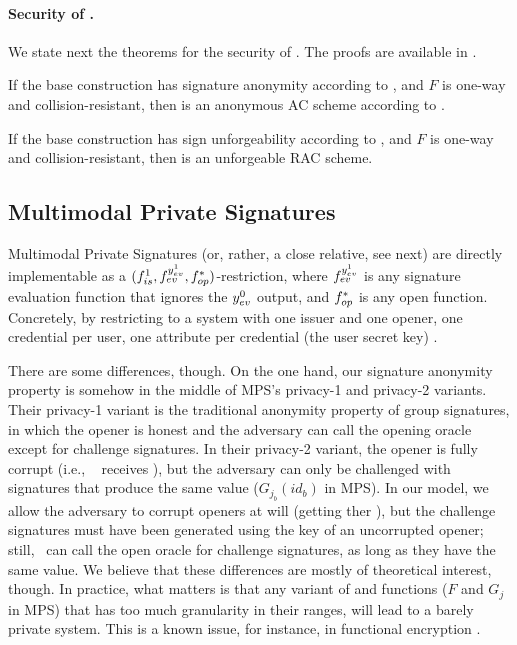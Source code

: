 \paragraph{Security of \CUASRAC.} %
We state next the theorems for the security of \CUASRAC. The proofs are
available in .

\begin{theorem}
  If the base \CUASGen construction has signature anonymity according to
  , and $F$ is one-way and collision-resistant,
  then \CUASAC is an anonymous AC scheme according to \cite{fhs19}.  
\end{theorem}

\begin{theorem}
  If the base \CUASGen construction has sign unforgeability according to
  , and $F$ is one-way and collision-resistant, then
  \CUASRAC is an unforgeable RAC scheme.
\end{theorem}


\subsection{Multimodal Private Signatures}
\label{ssec:related-models-mps}

Multimodal Private Signatures (or, rather, a close relative, see next) are
directly implementable as a $(f_{is}^1,f_{ev}^{y_{ev}^1},
f_{op}^{\ast})$-\CUASGen restriction, where $f_{ev}^{y_{ev}^1}$ is any signature
evaluation function that ignores the $y_{ev}^0$ output, and $f_{op}^{\ast}$ is
any open function. Concretely, by restricting to a system with one issuer and
one opener, one credential per user, one attribute per credential (the user
secret key)%
.

There are some differences, though. On the one hand, our signature anonymity
property is somehow in the middle of MPS's privacy-1 and privacy-2 variants.
Their privacy-1 variant is the traditional anonymity property of group
signatures, in which the opener is honest and the adversary can call the opening
oracle except for challenge signatures. In their privacy-2 variant, the opener
is fully corrupt (i.e., \adv~ receives \osk), but the adversary can only be
challenged with signatures that produce the same \yinsp value ($G_{j_b}(id_b)$
in MPS). In our \UAS model, we allow the adversary to corrupt openers at will
(getting ther \osk), but the challenge signatures must have been generated using
the key of an uncorrupted opener; still, \adv~can call the open oracle for
challenge signatures, as long as they have the same \yinsp value. We believe
that these differences are mostly of theoretical interest, though. In practice,
what matters is that any variant of \feval and \finsp functions ($F$ and $G_j$
in MPS) that has too much granularity in their ranges, will lead to a barely
private system. This is a known issue, for instance, in functional encryption
\needcite.

